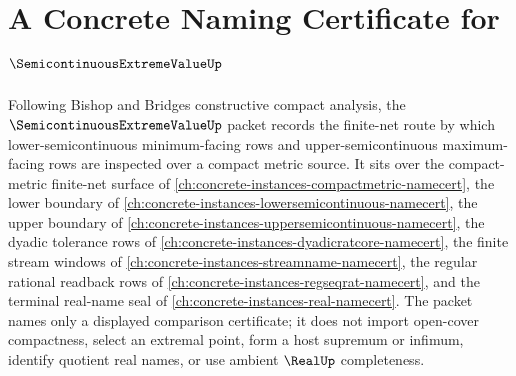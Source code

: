 \chapter{A Concrete Naming Certificate for $\SemicontinuousExtremeValueUp$}
\label{ch:concrete-instances-semicontinuous-extreme-value-namecert}

Following Bishop and Bridges constructive compact analysis, the $\SemicontinuousExtremeValueUp$ packet records the finite-net route by which lower-semicontinuous minimum-facing rows and upper-semicontinuous maximum-facing rows are inspected over a compact metric source. It sits over the compact-metric finite-net surface of \autoref{ch:concrete-instances-compactmetric-namecert}, the lower boundary of \autoref{ch:concrete-instances-lowersemicontinuous-namecert}, the upper boundary of \autoref{ch:concrete-instances-uppersemicontinuous-namecert}, the dyadic tolerance rows of \autoref{ch:concrete-instances-dyadicratcore-namecert}, the finite stream windows of \autoref{ch:concrete-instances-streamname-namecert}, the regular rational readback rows of \autoref{ch:concrete-instances-regseqrat-namecert}, and the terminal real-name seal of \autoref{ch:concrete-instances-real-namecert}. The packet names only a displayed comparison certificate; it does not import open-cover compactness, select an extremal point, form a host supremum or infimum, identify quotient real names, or use ambient $\RealUp$ completeness.

